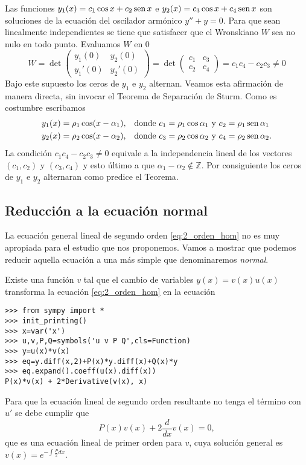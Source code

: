 \begin{ejemplo} Las funciones $y_1(x)=c_1\cos x+c_2\sen x$ e $y_2(x)=c_3\cos x+c_4\sen x$ son soluciones de la ecuación del oscilador armónico $y''+y=0$. Para que sean linealmente independientes se tiene que satisfacer que el Wronskiano $W$ sea no nulo en todo punto. Evaluamos $W$  en $0$ 
\[W=\det\begin{pmatrix} y_1(0) & y_2(0)\\y_1'(0) & y_2'(0) 
\end{pmatrix}=\det\begin{pmatrix} c_1 & c_3\\c_2 & c_4 
\end{pmatrix}=c_1c_4-c_2c_3\neq 0\]
Bajo este supuesto los ceros de $y_1$ e $y_2$ alternan. Veamos esta afirmación de manera directa, sin invocar el Teorema de Separación de Sturm. Como  es costumbre escribamos 
\[\begin{split}
y_1(x)=\rho_1\cos(x-\alpha_1),&\quad\text{donde } c_1=\rho_1\cos\alpha_1\text{ y }c_2=\rho_1\sen\alpha_1\\
y_2(x)=\rho_2\cos(x-\alpha_2),&\quad\text{donde }c_3=\rho_2\cos\alpha_2\text{ y }c_4=\rho_2\sen\alpha_2.
\end{split}
\]
La condición $c_1c_4-c_2c_3\neq 0$ equivale a la independencia lineal de los vectores $(c_1,c_2)$ y $(c_3,c_4)$ y esto último a que $\alpha_1-\alpha_2\notin\mathbb{Z}$. Por consiguiente los ceros de $y_1$ e $y_2$ alternaran como predice el Teorema. 


\end{ejemplo}

\subsection{Reducción a la ecuación normal}

La ecuación general lineal  de segundo orden  \eqref{eq:2_orden_hom} no es muy apropiada para el estudio que nos proponemos. Vamos a mostrar que podemos reducir aquella ecuación a una más simple que denominaremos \emph{normal}.

\begin{teorema} Existe una función $v$ tal que el cambio de variables $y(x)=v(x)u(x)$ transforma la ecuación \eqref{eq:2_orden_hom} en la ecuación
\end{teorema}
\begin{demo} 
\begin{lstlisting}
>>> from sympy import *
>>> init_printing()
>>> x=var('x')
>>> u,v,P,Q=symbols('u v P Q',cls=Function)
>>> y=u(x)*v(x)
>>> eq=y.diff(x,2)+P(x)*y.diff(x)+Q(x)*y
>>> eq.expand().coeff(u(x).diff(x))
P(x)*v(x) + 2*Derivative(v(x), x)
\end{lstlisting}

Para que la ecuación lineal de segundo orden resultante no tenga el término con $u'$ se debe cumplir que
\[ P{\left (x \right )} v{\left (x \right )} + 2 \frac{d}{d x} v{\left (x \right )}=0,\]
que es una ecuación lineal de primer orden para $v$, cuya  solución general es $v(x)=e^{-\int\frac{P}{2}dx}$.
\end{demo}

